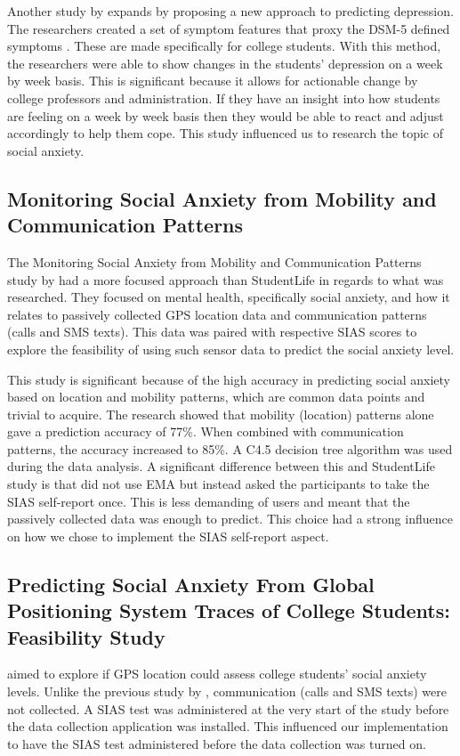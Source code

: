 \documentclass{l4proj}
\begin{document}
Another study by \citet{tracking_depression_college_using_phone} expands by proposing a new approach to predicting depression. The researchers created a set of symptom features that proxy the DSM-5 defined symptoms \citep{tracking_depression_college_using_phone}. These are made specifically for college students. With this method, the researchers were able to show changes in the students' depression on a week by week basis. This is significant because it allows for actionable change by college professors and administration. If they have an insight into how students are feeling on a week by week basis then they would be able to react and adjust accordingly to help them cope. This study influenced us to research the topic of social anxiety.


\subsection{Monitoring Social Anxiety from Mobility and Communication Patterns} %
The Monitoring Social Anxiety from Mobility and Communication Patterns study by \citet{boukhechba} had a more focused approach than StudentLife in regards to what was researched. They focused on mental health, specifically social anxiety, and how it relates to passively collected GPS location data and communication patterns (calls and SMS texts). This data was paired with respective SIAS scores to explore the feasibility of using such sensor data to predict the social anxiety level.

This study is significant because of the high accuracy in predicting social anxiety based on location and mobility patterns, which are common data points and trivial to acquire. The research showed that mobility (location) patterns alone gave a prediction accuracy of 77\%. When combined with communication patterns, the accuracy increased to 85\%. A C4.5 decision tree algorithm was used during the data analysis. A significant difference between this and StudentLife study is that \citet{boukhechba} did not use EMA but instead asked the participants to take the SIAS self-report once. This is less demanding of users and meant that the passively collected data was enough to predict. This choice had a strong influence on how we chose to implement the SIAS self-report aspect.

\subsection{Predicting Social Anxiety From Global Positioning System Traces of College Students: Feasibility Study} %
\citet{boukhechba_2} aimed to explore if GPS location could assess college students' social anxiety levels. Unlike the previous study by \citet{boukhechba}, communication (calls and SMS texts) were not collected. A SIAS test was administered at the very start of the study before the data collection application was installed. This influenced our implementation to have the SIAS test administered before the data collection was turned on.
\end{document}
